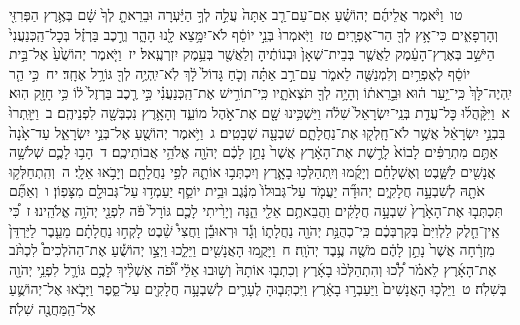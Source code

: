 \documentclass[18pt]{article}
\newcommand{\vart}[1]{\Bfootnote{#1}}	%
\begin{document}
 {\loc טו~}וַיֹּ֨אמֶר אֲלֵיהֶ֜ם יְהוֹשֻׁ֗עַ אִם־עַם־רַ֤ב אַתָּה֙ עֲלֵ֣ה לְךָ֣ הַיַּ֔עְרָה וּבֵרֵאתָ֤ לְךָ֙ שָׁ֔ם בְּאֶ֥רֶץ הַפְּרִזִּ֖י וְהָרְפָאִ֑ים כִּי־אָ֥ץ לְךָ֖ הַר־אֶפְרָֽיִם׃ \startlock
 {\loc טז~}וַיֹּֽאמְרוּ֙ בְּנֵ֣י יוֹסֵ֔ף לֹא־יִמָּ֥צֵא לָ֖נוּ הָהָ֑ר וְרֶ֣כֶב בַּרְזֶ֗ל בְּכׇל־הַֽכְּנַעֲנִי֙ הַיֹּשֵׁ֣ב בְּאֶרֶץ־הָעֵ֔מֶק לַאֲשֶׁ֤ר בְּבֵית־שְׁאָן֙ וּבְנוֹתֶ֔יהָ וְלַאֲשֶׁ֖ר בְּעֵ֥מֶק יִזְרְעֶֽאל׃ \startlock
 {\loc יז~}וַיֹּ֤אמֶר יְהוֹשֻׁ֙עַ֙ אֶל־בֵּ֣ית יוֹסֵ֔ף לְאֶפְרַ֥יִם וְלִמְנַשֶּׁ֖ה לֵאמֹ֑ר עַם־רַ֣ב אַתָּ֗ה וְכֹ֤חַ גָּדוֹל֙ לָ֔ךְ לֹֽא־יִֽהְיֶ֥ה לְךָ֖ גּוֹרָ֥ל אֶחָֽד׃ \startlock
 {\loc יח~}כִּ֣י הַ֤ר יִֽהְיֶה־לָּךְ֙ כִּֽי־יַ֣עַר ה֔וּא וּבֵ֣רֵאת֔וֹ וְהָיָ֥ה לְךָ֖ תֹּצְאֹתָ֑יו כִּֽי־תוֹרִ֣ישׁ אֶת־הַֽכְּנַעֲנִ֗י כִּ֣י רֶ֤כֶב בַּרְזֶל֙ ל֔וֹ כִּ֥י חָזָ֖ק הֽוּא׃ 
\startlock
 {\loc א~}וַיִּקָּ֨הֲל֜וּ כׇּל־עֲדַ֤ת בְּנֵֽי־יִשְׂרָאֵל֙ שִׁלֹ֔ה וַיַּשְׁכִּ֥ינוּ שָׁ֖ם אֶת־אֹ֣הֶל מוֹעֵ֑ד וְהָאָ֥רֶץ נִכְבְּשָׁ֖ה לִפְנֵיהֶֽם׃ \startlock
 {\loc ב~}וַיִּוָּֽתְרוּ֙ בִּבְנֵ֣י יִשְׂרָאֵ֔ל אֲשֶׁ֥ר לֹא־חָֽלְק֖וּ אֶת־נַחֲלָתָ֑ם שִׁבְעָ֖ה שְׁבָטִֽים׃ \startlock
 {\loc ג~}וַיֹּ֥אמֶר יְהוֹשֻׁ֖עַ אֶל־בְּנֵ֣י יִשְׂרָאֵ֑ל עַד־אָ֙נָה֙ אַתֶּ֣ם מִתְרַפִּ֔ים לָבוֹא֙ לָרֶ֣שֶׁת אֶת־הָאָ֔רֶץ אֲשֶׁר֙ נָתַ֣ן לָכֶ֔ם יְהֹוָ֖ה אֱלֹהֵ֥י אֲבוֹתֵיכֶֽם׃ \startlock
 {\loc ד~}הָב֥וּ לָכֶ֛ם שְׁלֹשָׁ֥ה אֲנָשִׁ֖ים לַשָּׁ֑בֶט וְאֶשְׁלָחֵ֗ם וְיָקֻ֜מוּ וְיִֽתְהַלְּכ֥וּ בָאָ֛רֶץ וְיִכְתְּב֥וּ אוֹתָ֛הּ לְפִ֥י נַחֲלָתָ֖ם וְיָבֹ֥אוּ אֵלָֽי׃ \startlock
 {\loc ה~}וְהִֽתְחַלְּק֥וּ אֹתָ֖הּ לְשִׁבְעָ֣ה חֲלָקִ֑ים יְהוּדָ֞ה יַעֲמֹ֤ד עַל־גְּבוּלוֹ֙ מִנֶּ֔גֶב וּבֵ֥ית יוֹסֵ֛ף יַעַמְד֥וּ עַל־גְּבוּלָ֖ם מִצָּפֽוֹן׃ \startlock
 {\loc ו~}וְאַתֶּ֞ם תִּכְתְּב֤וּ אֶת־הָאָ֙רֶץ֙ שִׁבְעָ֣ה חֲלָקִ֔ים וַהֲבֵאתֶ֥ם אֵלַ֖י הֵ֑נָּה וְיָרִ֨יתִי לָכֶ֤ם גּוֹרָל֙ פֹּ֔ה לִפְנֵ֖י יְהֹוָ֥ה אֱלֹהֵֽינוּ׃ \startlock
 {\loc ז~}כִּ֠י אֵֽין־חֵ֤לֶק לַלְוִיִּם֙ בְּקִרְבְּכֶ֔ם כִּֽי־כְהֻנַּ֥ת יְהֹוָ֖ה נַחֲלָת֑וֹ וְגָ֡ד וּרְאוּבֵ֡ן וַחֲצִי֩ שֵׁ֨בֶט  \edtext{הַֽמְנַשֶּׁ֜ה}{\vart{א=הַֽמֲנַשֶּׁ֜ה | }}  לָקְח֣וּ נַחֲלָתָ֗ם מֵעֵ֤בֶר לַיַּרְדֵּן֙ מִזְרָ֔חָה אֲשֶׁר֙ נָתַ֣ן לָהֶ֔ם מֹשֶׁ֖ה עֶ֥בֶד יְהֹוָֽה׃ \startlock
 {\loc ח~}וַיָּקֻ֥מוּ הָאֲנָשִׁ֖ים וַיֵּלֵ֑כוּ וַיְצַ֣ו יְהוֹשֻׁ֡עַ אֶת־הַהֹלְכִים֩ לִכְתֹּ֨ב אֶת־הָאָ֜רֶץ לֵאמֹ֗ר לְ֠כ֠וּ וְהִתְהַלְּכ֨וּ בָאָ֜רֶץ וְכִתְב֤וּ אוֹתָהּ֙ וְשׁ֣וּבוּ אֵלַ֔י וּ֠פֹ֠ה אַשְׁלִ֨יךְ לָכֶ֥ם גּוֹרָ֛ל לִפְנֵ֥י יְהֹוָ֖ה בְּשִׁלֹֽה׃ \startlock
 {\loc ט~}וַיֵּלְכ֤וּ הָאֲנָשִׁים֙ וַיַּעַבְר֣וּ בָאָ֔רֶץ וַיִּכְתְּב֧וּהָ לֶעָרִ֛ים לְשִׁבְעָ֥ה חֲלָקִ֖ים עַל־סֵ֑פֶר וַיָּבֹ֧אוּ אֶל־יְהוֹשֻׁ֛עַ אֶל־הַֽמַּחֲנֶ֖ה שִׁלֹֽה׃ \startlock
\end{document}

